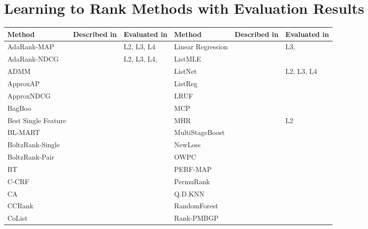 \documentclass{sig-alternate}
\begin{document}
\section{Learning to Rank Methods with Evaluation Results}
\label{app:ltr_methods_used}
\begin{table}[!hp]
\begin{tabular}{lll|lll}\toprule
Method & Described in & Evaluated in & Method & Described in & Evaluated in\\
\midrule
AdaRank-MAP & \cite{Xu2007} & L2, L3, L4 & Linear Regression & \cite{Cossock2006} & L3, \cite{Wang2012, Volkovs2011} \\ 
AdaRank-NDCG & \cite{Xu2007} & L2, L3, L4,  \cite{Busa-Fekete2013,Tan2013} & ListMLE & \cite{Xia2008} & \cite{Lin2010, Lin2011, Gao2014} \\ 
ADMM & \cite{Duh2011} & \cite{Duh2011} & ListNet & \cite{Cao2007} & L2, L3, L4 \\ 
ApproxAP & \cite{Qin2010b} & \cite{Qin2010b} & ListReg & \cite{Wu2011} & \cite{Wu2011} \\ 
ApproxNDCG & \cite{Qin2010b} & \cite{Qin2010b} & LRUF & \cite{Torkestani2012b} & \cite{Torkestani2012b} \\ 
BagBoo & \cite{Pavlov2010} & \cite{Ganjisaffar2011c} & MCP & \cite{Laporte2013} & \cite{Laporte2013} \\ 
Best Single Feature &  & \cite{Gomes2013} & MHR & \cite{Qin2007} & L2 \\ 
BL-MART & \cite{Ganjisaffar2011c} & \cite{Ganjisaffar2011c} & MultiStageBoost & \cite{Kao2013} & \cite{Kao2013} \\ 
BoltzRank-Single & \cite{Volkovs2009} & \cite{Volkovs2009, Volkovs2013} & NewLoss & \cite{Peng2010} & \cite{Peng2010} \\ 
BoltzRank-Pair & \cite{Volkovs2009} & \cite{Volkovs2009, Ganjisaffar2011c, Volkovs2013} & OWPC & \cite{Usunier2009} & \cite{Usunier2009} \\ 
BT & \cite{Zhou2008} & \cite{Zhou2008} & PERF-MAP & \cite{Pan2011} & \cite{Torkestani2012b} \\ 
C-CRF & \cite{Qin2008b} & \cite{Qin2008b} & PermuRank & \cite{Xu2008} & \cite{Xu2008} \\ 
CA & \cite{Metzler2007} & \cite{Busa-Fekete2013,Tan2013} & Q.D.KNN & \cite{Geng2008} & \cite{Wang2013} \\ 
CCRank & \cite{Wang2011c} & \cite{Wang2011c} & RandomForest &  & \cite{Gomes2013} \\ 
CoList & \cite{Gao2014} & \cite{Gao2014} & Rank-PMBGP & \cite{Sato2013} & \cite{Sato2013} \\ 

\end{tabular}
\end{table}
\end{document}
